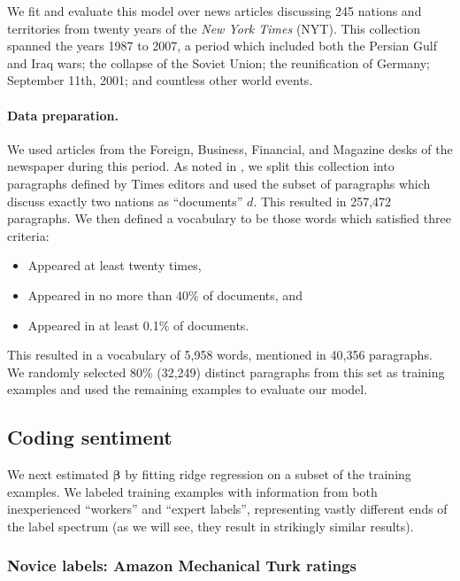 We fit and evaluate this model over news articles discussing 245
nations and territories from twenty years of the \emph{New York Times}
(NYT).  This collection spanned the years 1987 to 2007, a period which
included both the Persian Gulf and Iraq wars; the collapse of the
Soviet Union; the reunification of Germany; September 11th, 2001; and
countless other world events.

\paragraph{Data preparation.}
We used articles from the Foreign, Business, Financial, and Magazine
desks of the newspaper during this period. As noted in
, we split this collection into paragraphs
defined by Times editors and used the subset of paragraphs which
discuss exactly two nations as ``documents'' $d$.  This resulted in
257,472 paragraphs.  We then defined a vocabulary to be those words
which satisfied three criteria:
\begin{itemize}
  \item Appeared at least twenty times,
  \item Appeared in no more than 40\% of documents, and
  \item Appeared in at least 0.1\% of documents.
\end{itemize}

This resulted in a vocabulary of 5,958 words, mentioned in 40,356
paragraphs. We randomly selected 80\% (32,249) distinct paragraphs
from this set as training examples and used the remaining examples to
evaluate our model.

\subsection{Coding sentiment}
\label{section:sentiment_models}

We next estimated $\bm \beta$ by fitting ridge regression on a subset
of the training examples.  We labeled training examples with
information from both inexperienced ``workers'' and ``expert labels'',
representing vastly different ends of the label spectrum (as we will
see, they result in strikingly similar results).

\subsubsection{Novice labels: Amazon Mechanical Turk ratings}
\label{section:mturk}

